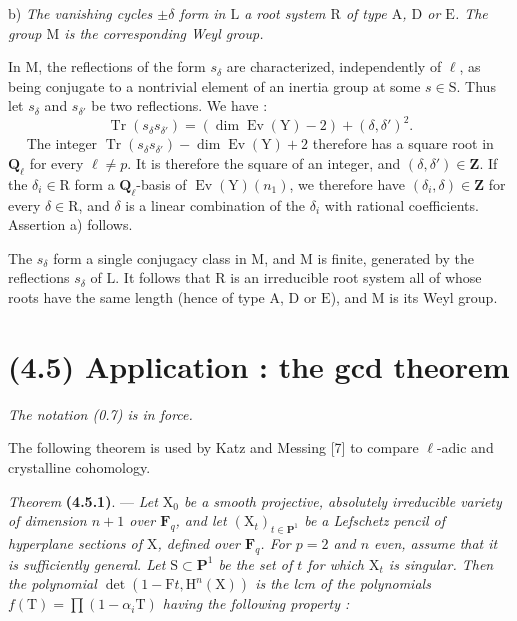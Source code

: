 \documentclass[11pt,leqno]{article}
\newcommand{\Page}[1]{\ifvmode\noindent\else\unskip\ \fi{\footnotesize\textcolor{gray}{[p.\,#1]}}\ \ignorespaces}
\begin{document}
b) \textit{The vanishing cycles \(\pm\delta\) form in \(\mathrm{L}\) a root system \(\mathrm{R}\) of type \(\mathrm{A}\), \(\mathrm{D}\) or \(\mathrm{E}\). The group \(\mathrm{M}\) is the corresponding Weyl group.}

In \(\mathrm{M}\), the reflections of the form \(s_\delta\) are characterized, independently of \(\ell\), as being conjugate to a nontrivial element of an inertia group at some \(s\in\mathrm{S}\). Thus let \(s_\delta\) and \(s_{\delta'}\) be two reflections. We have :
\[
\operatorname{Tr}(s_\delta s_{\delta'})
=(\dim\operatorname{Ev}(\mathrm{Y})-2)+(\delta,\delta')^2.
\]
\Page{231}
The integer \(\operatorname{Tr}(s_\delta s_{\delta'})-\dim\operatorname{Ev}(\mathrm{Y})+2\) therefore has a square root in \(\mathbf{Q}_\ell\) for every \(\ell\neq p\). It is therefore the square of an integer, and \((\delta,\delta')\in\mathbf{Z}\). If the \(\delta_i\in\mathrm{R}\) form a \(\mathbf{Q}_\ell\)-basis of \(\operatorname{Ev}(\mathrm{Y})(n_1)\), we therefore have \((\delta_i,\delta)\in\mathbf{Z}\) for every \(\delta\in\mathrm{R}\), and \(\delta\) is a linear combination of the \(\delta_i\) with rational coefficients. Assertion a) follows.

The \(s_\delta\) form a single conjugacy class in \(\mathrm{M}\), and \(\mathrm{M}\) is finite, generated by the reflections \(s_\delta\) of \(\mathrm{L}\). It follows that \(\mathrm{R}\) is an irreducible root system all of whose roots have the same length (hence of type \(\mathrm{A}\), \(\mathrm{D}\) or \(\mathrm{E}\)), and \(\mathrm{M}\) is its Weyl group.

\section*{(4.5) Application : the gcd theorem}

\textit{The notation \textup{(0.7)} is in force.}

The following theorem is used by Katz and Messing [7] to compare \(\ell\)-adic and crystalline cohomology.

\textit{Theorem} \textbf{(4.5.1)}. — \textit{Let \(\mathrm{X}_0\) be a smooth projective, absolutely irreducible variety of dimension \(n+1\) over \(\mathbf{F}_q\), and let \((\mathrm{X}_t)_{t\in\mathbf{P}^1}\) be a Lefschetz pencil of hyperplane sections of \(\mathrm{X}\), defined over \(\mathbf{F}_q\). For \(p=2\) and \(n\) even, assume that it is sufficiently general. Let \(\mathrm{S}\subset\mathbf{P}^1\) be the set of \(t\) for which \(\mathrm{X}_t\) is singular. Then the polynomial \(\det(1-\mathrm{F}t,\mathrm{H}^n(\mathrm{X}))\) is the lcm of the polynomials \(f(\mathrm{T})=\prod(1-\alpha_i\mathrm{T})\) having the following property :}
\end{document}

